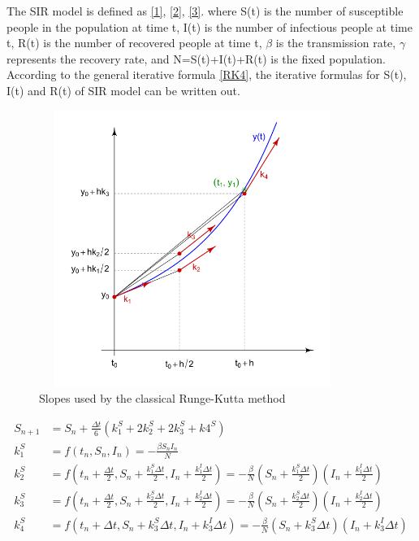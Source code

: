 \documentclass[a4paper]{article}
\begin{document}
        \indent The SIR model is defined as \eqref{1}, \eqref{2}, \eqref{3}. where S(t) is the number of susceptible people in the population at time t, I(t) is the number of infectious people at time t, R(t) is the number of recovered people at time t, $\beta$ is the transmission rate, $\gamma$ represents the recovery rate, and N=S(t)+I(t)+R(t) is the fixed population. \\
        \indent According to the general iterative formula \eqref{RK4}, the iterative formulas for S(t), I(t) and R(t) of SIR model can be written out. 
        \begin{figure}[h]
            \includegraphics[width=10cm, height=9cm, center]{Images/Runge-Kutta_slopes.png}
            \caption{Slopes used by the classical Runge-Kutta method}
            \label{fig:rk4}
        \end{figure}
        \begin{equation}\label{RK4-SIR-1}
            \begin{split}
                S_{n+1} & = S_n + \frac{\Delta t}{6}(k_1^S + 2k_2^S + 2k_3^S + k4^S) \\
                k_1^S & = f(t_n,S_n, I_n) = - \frac{\beta S_n I_n}{N} \\
                k_2^S & = f(t_n + \frac{\Delta t}{2}, S_n + \frac{k_1^S \Delta t}{2}, I_n + \frac{k_1^I \Delta t}{2}) = -\frac{\beta}{N} ( S_n + \frac{k_1^S \Delta t}{2})(I_n + \frac{k_1^I \Delta t}{2})  \\
                k_3^S & = f(t_n + \frac{\Delta t}{2}, S_n + \frac{k_2^S \Delta t}{2}, I_n + \frac{k_2^I \Delta t}{2}) = -\frac{\beta}{N} ( S_n + \frac{k_2^S \Delta t}{2})(I_n + \frac{k_2^I \Delta t}{2})  \\
                k_4^S & = f(t_n + \Delta t, S_n + k_3^S \Delta t, I_n + k_3^I \Delta t) = -\frac{\beta}{N} (S_n + k_3^S \Delta t)(I_n + k_3^I \Delta t)
            \end{split}
        \end{equation}
\end{document}
